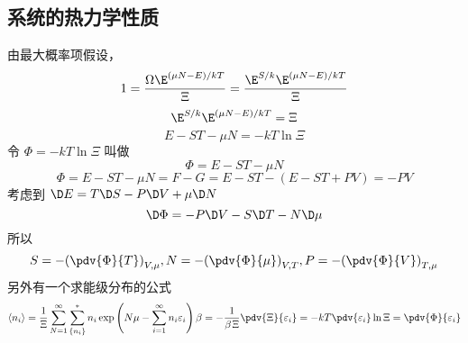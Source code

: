 \subsection{系统的热力学性质}
由最大概率项假设，
\begin{equation}
1 = \frac{{\Omega {\E^{{{\left( {\mu N - E} \right)} \mathord{\left/
 {\vphantom {{\left( {\mu N - E} \right)} {kT}}} \right.
 \kern-\nulldelimiterspace} {kT}}}}}}{\Xi } = \frac{{{\E^{S/k}}{\E^{{{\left( {\mu N - E} \right)} \mathord{\left/
 {\vphantom {{\left( {\mu N - E} \right)} {kT}}} \right.
 \kern-\nulldelimiterspace} {kT}}}}}}{\Xi }
\end{equation}
\begin{equation} 
 {\E^{S/k}}{\E^{{{\left( {\mu N - E} \right)} \mathord{\left/
 {\vphantom {{\left( {\mu N - E} \right)} {kT}}} \right.
 \kern-\nulldelimiterspace} {kT}}}} = \Xi 
\end{equation}
\begin{equation} 
 E - ST - \mu N =  - kT\ln \Xi
\end{equation}
令 $\Phi  =  - kT\ln \Xi $ 叫做
\begin{equation}
 \Phi  = E - ST - \mu N
\end{equation}
\begin{equation}
\Phi  = E - ST - \mu N = F - G = E - ST - (E - ST + PV) =  - PV
\end{equation}
考虑到 $ \D E = T\D S - P\D V + \mu \D N$
\begin{equation}
\D \Phi  =  - P\D V - S\D T - N\D \mu
\end{equation}
所以
\begin{equation}
S =  - {\left( {\pdv{\Phi}{T}} \right)_{V,\mu }} , N =  - {\left( {\pdv{\Phi}{\mu}} \right)_{V,T}} , P =  - {\left( {\pdv{\Phi}{V}} \right)_{T,\mu }}
\end{equation}
另外有一个求能级分布的公式
\begin{equation}
\left\langle {{n_i}} \right\rangle  = \frac{1}{\Xi }\sum\limits_{N = 1}^\infty  {\sum\limits_{\{ {n_i}\} }^ *  {{n_i}\exp \left( {N\mu  - \sum\limits_{i = 1}^\infty  {{n_i}{\varepsilon_i}} } \right)\beta } }  =  - \frac{1}{{\beta {\kern 1pt} \Xi }} \pdv{\Xi}{\varepsilon_i} =  - kT \pdv{\varepsilon_i} \ln \Xi  = \pdv{\Phi}{\varepsilon_i}
\end{equation}